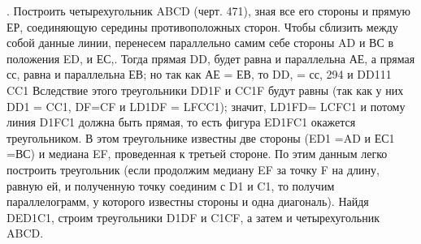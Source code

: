 . Построить четырехугольник ABCD (черт. 471), зная все его стороны и прямую ЕР, соединяющую середины противоположных сторон.
Чтобы сблизить между собой данные линии, перенесем параллельно самим себе стороны AD и ВС в положения ED, и ЕС,. Тогда прямая DD, будет равна и параллельна АЕ, а прямая сс, равна и параллельна ЕВ; но так как АЕ = ЕВ, то DD, = сс,
294
и DD111 CC1
Вследствие этого треугольники DD1F и CC1F будут равны (так как у них DD1 = CC1, DF=CF и LD1DF = LFCC1);
значит, LD1FD= LCFC1 и потому линия D1FC1 должна быть прямая, то есть фигура ED1FC1 окажется треугольником.
В этом треугольнике известны две стороны (ED1 =AD и ЕС1 =ВС) и медиана EF, проведенная к третьей стороне.
По этим данным легко построить треугольник (если продолжим медиану EF за точку F на длину, равную ей, и полученную точку соединим с D1 и C1, то получим параллелограмм, у которого известны стороны и одна диагональ).
Найдя DED1C1, строим треугольники D1DF и C1CF, а затем и четырехугольник ABCD.
